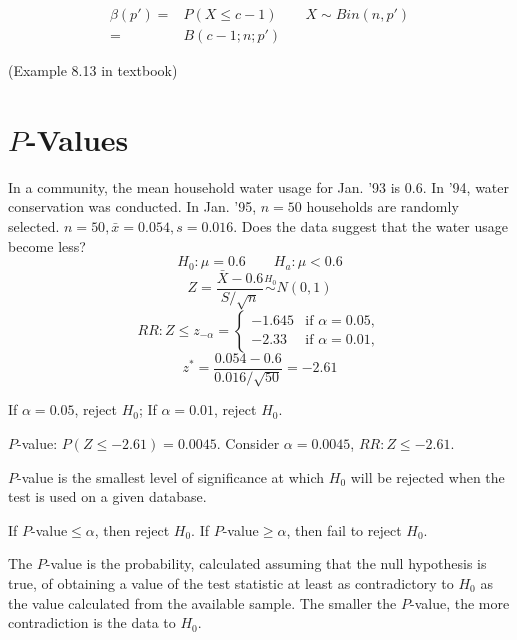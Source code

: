 \begin{align*}
\beta(p')= & P(X \leq c-1) \qquad X \sim Bin(n,p') \\
= & B(c-1;n;p')
\end{align*}

\begin{exmp}
(Example 8.13 in textbook)
\end{exmp}

\section{$P$-Values}
\begin{exmp}
In a community, the mean household water usage for Jan. '93 is 0.6. In '94, water conservation was conducted. In Jan. '95, $n=50$ households are randomly selected. $n=50,\bar{x}=0.054,s=0.016$. Does the data suggest that the water usage become less?
\[H_0:\mu=0.6 \qquad H_a:\mu<0.6\]
\[Z=\frac{\bar{X}-0.6}{S/\sqrt{n}}\overset{H_0}{\sim} N(0,1)\]
\[RR: Z\leq z_{-\alpha}=\begin{cases}
-1.645 &\text{if }\alpha=0.05, \\
-2.33 &\text{if }\alpha=0.01, 
\end{cases}\]
\[z^*=\frac{0.054-0.6}{0.016/\sqrt{50}}=-2.61\]

If $\alpha=0.05$, reject $H_0$; If $\alpha=0.01$, reject $H_0$.

$P$-value: $P(Z\leq-2.61)=0.0045$. Consider $\alpha=0.0045$, $RR:Z\leq-2.61$.
\end{exmp}

\begin{defn}
$P$-value is the smallest level of significance at which $H_0$ will be rejected when the test is used on a given database.
\end{defn}

\begin{mdframed}[style=exampledefault,frametitle={Conclusion}]
If $P$-value$\leq \alpha$, then reject $H_0$. If $P$-value$\geq \alpha$, then fail to reject $H_0$. 
\end{mdframed}


\begin{defn}
The $P$-value is the probability, calculated assuming that the null hypothesis is true, of obtaining a value of the test statistic at least as contradictory to $H_0$ as the value calculated from the available sample. The smaller the $P$-value, the more contradiction is the data to $H_0$.
\end{defn}

